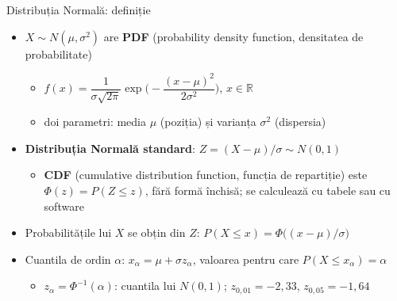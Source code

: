 \begin{frame}{Distribuția Normală: definiție}
\itemsize{\small}
\begin{itemize}
    \item $X \sim N(\mu, \sigma^2)$ are \textbf{PDF} (probability density function, densitatea de probabilitate)
    \begin{itemize}
        \item $f(x) = \dfrac{1}{\sigma\sqrt{2\pi}} \exp\Big(-\dfrac{(x - \mu)^2}{2\sigma^2}\Big)$, \quad $x \in \mathbb{R}$
        \item doi parametri: media $\mu$ (poziția) și varianța $\sigma^2$ (dispersia)
    \end{itemize}
    \item \textbf{Distribuția Normală standard}: $Z = (X - \mu)/\sigma \sim N(0, 1)$
    \begin{itemize}
        \item \textbf{CDF} (cumulative distribution function, funcția de repartiție) este $\Phi(z) = P(Z \le z)$, fără formă închisă; se calculează cu tabele sau cu software
    \end{itemize}
    \item Probabilitățile lui $X$ se obțin din $Z$: $P(X \le x) = \Phi\big((x - \mu)/\sigma\big)$
    \item Cuantila de ordin $\alpha$: $x_\alpha = \mu + \sigma z_\alpha$, valoarea pentru care $P(X \le x_\alpha) = \alpha$
    \begin{itemize}
        \item $z_\alpha = \Phi^{-1}(\alpha)$: cuantila lui $N(0, 1)$; $z_{0{,}01} = -2{,}33$, $z_{0{,}05} = -1{,}64$
    \end{itemize}
\end{itemize}
\end{frame}

